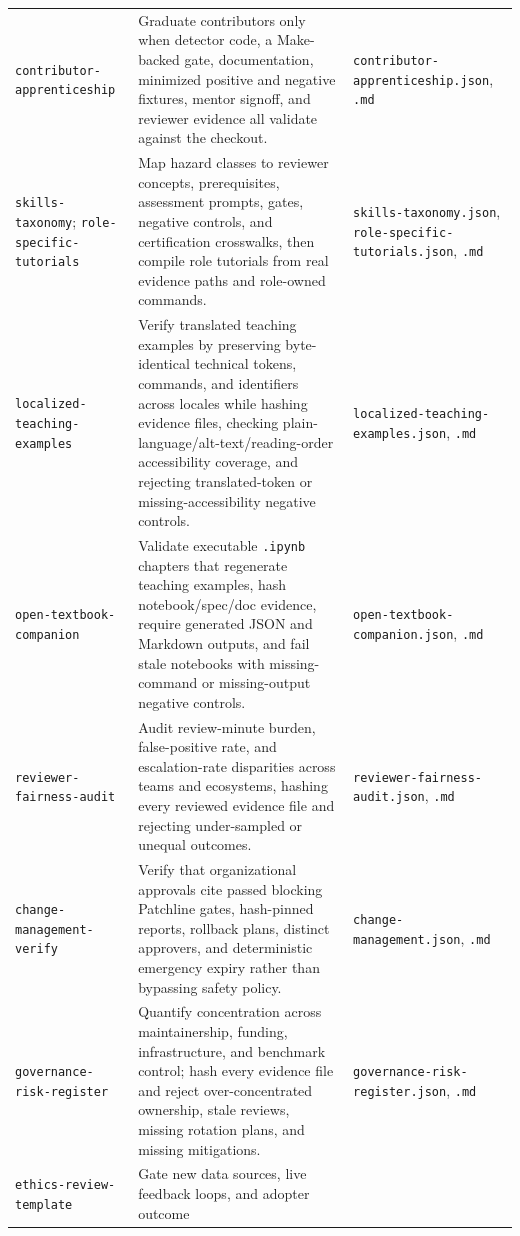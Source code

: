 \documentclass[11pt]{article}
\newcommand{\code}[1]{\texttt{#1}}
\begin{document}
\begin{longtable}{>{\raggedright\arraybackslash}p{2.3cm}>{\raggedright\arraybackslash}p{8.2cm}>{\raggedright\arraybackslash}p{3.4cm}}
\code{contributor-apprenticeship} & Graduate contributors only when detector code, a Make-backed
gate, documentation, minimized positive and negative fixtures, mentor signoff, and reviewer evidence
all validate against the checkout. & \code{contributor-apprenticeship.json}, \code{.md} \\
\code{skills-taxonomy}; \code{role-specific-tutorials} & Map hazard classes to reviewer concepts,
prerequisites, assessment prompts, gates, negative controls, and certification crosswalks, then compile
role tutorials from real evidence paths and role-owned commands. & \code{skills-taxonomy.json},
\code{role-specific-tutorials.json}, \code{.md} \\
\code{localized-teaching-examples} & Verify translated teaching examples by preserving byte-identical
technical tokens, commands, and identifiers across locales while hashing evidence files, checking
plain-language/alt-text/reading-order accessibility coverage, and rejecting translated-token or
missing-accessibility negative controls. & \code{localized-teaching-examples.json}, \code{.md} \\
\code{open-textbook-companion} & Validate executable \code{.ipynb} chapters that regenerate teaching
examples, hash notebook/spec/doc evidence, require generated JSON and Markdown outputs, and fail stale
notebooks with missing-command or missing-output negative controls. & \code{open-textbook-companion.json},
\code{.md} \\
\code{reviewer-fairness-audit} & Audit review-minute burden, false-positive rate, and escalation-rate
disparities across teams and ecosystems, hashing every reviewed evidence file and rejecting under-sampled
or unequal outcomes. & \code{reviewer-fairness-audit.json}, \code{.md} \\
\code{change-management-verify} & Verify that organizational approvals cite passed blocking Patchline
gates, hash-pinned reports, rollback plans, distinct approvers, and deterministic emergency expiry rather
than bypassing safety policy. & \code{change-management.json}, \code{.md} \\
\code{governance-risk-register} & Quantify concentration across maintainership, funding,
infrastructure, and benchmark control; hash every evidence file and reject over-concentrated ownership,
stale reviews, missing rotation plans, and missing mitigations. & \code{governance-risk-register.json}, \code{.md} \\
\code{ethics-review-template} & Gate new data sources, live feedback loops, and adopter outcome

\end{longtable}
\end{document}
